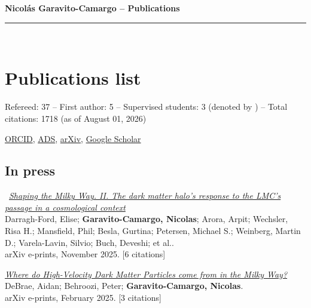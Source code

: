 \documentclass[14pt]{article}
\begin{document}
\begin{center}
\indent \textbf{\LARGE Nicol\'as Garavito-Camargo -- Publications} \\
\indent \rule{17cm}{0.4pt}\\
\end{center}

\fontsize{11}{11}\selectfont

\section*{Publications list}

Refereed: 37 -- First author: 5 -- Supervised students: 3 (denoted by \dag) -- Total citations: 1718 (as of August 01, 2026)

\noindent \href{https://orcid.org/0000-0001-7107-1744}{ORCID}, \href{https://ui.adsabs.harvard.edu/search/q=docs(library%2F0X5_bcuLT4iE-6-Nko0kmg)&sort=date%20desc%2C%20bibcode%20desc&p_=0}{ADS}, \href{https://arxiv.org/search/?query=garavito-camargo&searchtype=all}{arXiv}, \href{https://scholar.google.com/citations?user=QDLiOFYAAAAJ&hl=en&oi=ao}{Google Scholar}\\

\subsection*{In press}

\begin{etaremune}
\item \dag\ \textit{\href{https://ui.adsabs.harvard.edu/abs/2025arXiv251102031D/abstract}{Shaping the Milky Way. II. The dark matter halo's response to the LMC's passage in a cosmological context}}\\
  {\small \color{darkgray} Darragh-Ford, Elise; \textbf{Garavito-Camargo, Nicolas}; Arora, Arpit; Wechsler, Risa H.; Mansfield, Phil; Besla, Gurtina; Petersen, Michael S.; Weinberg, Martin D.; Varela-Lavin, Silvio; Buch, Deveshi; et al..\\
  arXiv e-prints, November 2025. [6 citations]}

\item \textit{\href{https://ui.adsabs.harvard.edu/abs/2025arXiv250217565D/abstract}{Where do High-Velocity Dark Matter Particles come from in the Milky Way?}}\\
  {\small \color{darkgray} DeBrae, Aidan; Behroozi, Peter; \textbf{Garavito-Camargo, Nicolas}.\\
  arXiv e-prints, February 2025. [3 citations]}

\end{etaremune}
\end{document}
